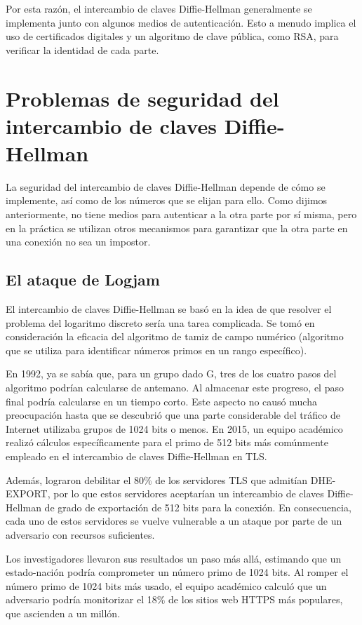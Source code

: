 \documentclass[11pt]{article}
\begin{document}
Por esta razón, el intercambio de claves Diffie-Hellman generalmente se implementa junto con algunos medios de autenticación. Esto a menudo implica el uso de certificados digitales y un algoritmo de clave pública, como RSA, para verificar la identidad de cada parte.


\section{Problemas de seguridad del intercambio de claves Diffie-Hellman}
La seguridad del intercambio de claves Diffie-Hellman depende de cómo se implemente, así como de los números que se elijan para ello. Como dijimos anteriormente, no tiene medios para autenticar a la otra parte por sí misma, pero en la práctica se utilizan otros mecanismos para garantizar que la otra parte en una conexión no sea un impostor.

\subsection {El ataque de Logjam}

El intercambio de claves Diffie-Hellman se basó en la idea de que resolver el problema del logaritmo discreto sería una tarea complicada. Se tomó en consideración la eficacia del algoritmo de tamiz de campo numérico (algoritmo que se utiliza para identificar números primos en un rango específico).

En 1992, ya se sabía que, para un grupo dado G, tres de los cuatro pasos del algoritmo podrían calcularse de antemano. Al almacenar este progreso, el paso final podría calcularse en un tiempo corto. Este aspecto no causó mucha preocupación hasta que se descubrió que una parte considerable del tráfico de Internet utilizaba grupos de 1024 bits o menos. En 2015, un equipo académico realizó cálculos específicamente para el primo de 512 bits más comúnmente empleado en el intercambio de claves Diffie-Hellman en TLS.

Además, lograron debilitar el 80$\%$ de los servidores TLS que admitían DHE-EXPORT, por lo que estos servidores aceptarían un intercambio de claves Diffie-Hellman de grado de exportación de 512 bits para la conexión. En consecuencia, cada uno de estos servidores se vuelve vulnerable a un ataque por parte de un adversario con recursos suficientes.

Los investigadores llevaron sus resultados un paso más allá, estimando que un estado-nación podría comprometer un número primo de 1024 bits. Al romper el número primo de 1024 bits más usado, el equipo académico calculó que un adversario podría monitorizar el 18$\%$ de los sitios web HTTPS más populares, que ascienden a un millón.
\end{document}
